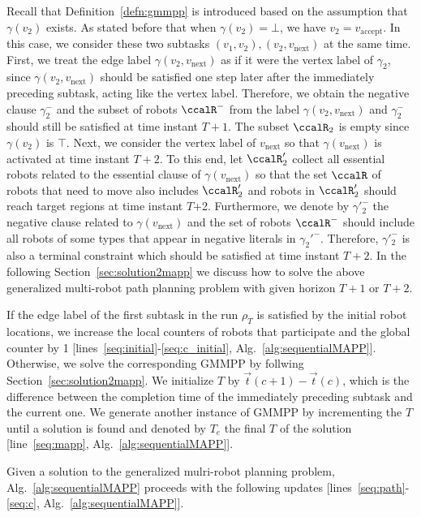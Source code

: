 \documentclass[journal]{IEEEtran}
\begin{document}
{  Recall that Definition~\ref{defn:gmmpp} is introduced based on the assumption that $\gamma(v_2)$ exists.  As stated before that when $\gamma(v_2) = \bot$, we have $v_2 = v_{\text{accept}}$. In this case, we consider these two subtasks $(v_1, v_2), (v_2, v_{\text{next}})$ at the same time. First, we treat the edge label $\gamma(v_2, v_{\text{next}})$ as if it were the vertex label of $\gamma_2$, since $\gamma(v_2, v_{\text{next}})$ should be satisfied one step later after the immediately preceding subtask, acting like the vertex label. Therefore, we obtain the negative clause $\gamma^-_2$ and the subset of robots $\ccalR^-$  from the label $\gamma(v_2, v_{\text{next}})$ and $\gamma_2^-$ should still be satisfied at time instant $T+1$. The subset $\ccalR_2$ is empty since $\gamma(v_2)$ is $\top$. Next, we consider the vertex label of $v_{\text{next}}$ so that $\gamma(v_{\text{next}})$ is activated at time instant $T+2$. To this end, let $\ccalR'_2$ collect all essential robots related to the  essential clause of $\gamma(v_{\text{next}})$ so that the set $\ccalR$ of robots that need to move also includes $\ccalR'_2$ and robots in $\ccalR'_2$ should reach target regions at time instant $T$+2. Furthermore, we denote by $\gamma'^-_2$ the negative clause related to $\gamma(v_{\text{next}})$ and the set of robots $\ccalR^-$ should include all robots of some types that appear in negative literals in $\gamma_2'^-$. Therefore, $\gamma'^-_2$ is also a terminal constraint which should be satisfied at time instant $T+2$. In the following Section~\ref{sec:solution2mapp} we discuss how to solve the above  generalized multi-robot path planning problem with given horizon $T+1$ or $T+2$.

  If the edge label of the first subtask in the run $\rho_T$ is satisfied by the initial  robot locations, we increase the  local counters of robots that participate   and the global counter by 1 [lines~\ref{seq:initial}-\ref{seq:c_initial}, Alg.~\ref{alg:sequentialMAPP}]. Otherwise, we solve the corresponding GMMPP by follwing Section~\ref{sec:solution2mapp}.   We initialize  $T$ by $\vec{t}(c+1) - \vec{t}(c)$,  which is the difference between the completion time of the immediately preceding subtask and the current one. We generate another instance of GMMPP by incrementing the $T$ until a solution is found and denoted by $T_e$  the final $T$ of the solution [line~\ref{seq:mapp}, Alg.~\ref{alg:sequentialMAPP}]. {Given a solution to the generalized mulri-robot planning problem, Alg.~\ref{alg:sequentialMAPP} proceeds with the following updates [lines~\ref{seq:path}-\ref{seq:c}, Alg.~\ref{alg:sequentialMAPP}].

}}
\end{document}
